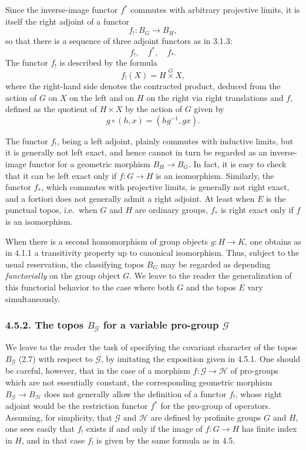\documentclass[11pt]{article}
\newcommand{\G}{\mathcal{G}}
\newcommand{\Hh}{\mathcal{H}}
\newcommand{\ie}{i.e.}
\newcommand{\contracted}{\mathop{\times}\limits^{G}}
\begin{document}
Since the inverse-image functor \(f^\ast\) commutes with arbitrary projective limits, it is itself the right adjoint of a functor
\[
f_!:B_G\longrightarrow B_H,
\]
so that there is a sequence of three adjoint functors as in 3.1.3:
\[
f_!,\quad f^\ast,\quad f_\ast.
\]
The functor \(f_!\) is described by the formula
\[
f_!(X)=H\contracted X,
\]
where the right-hand side denotes the contracted product, deduced from the action of \(G\) on \(X\) on the left and on \(H\) on the right via right translations and \(f\), defined as the quotient of \(H\times X\) by the action of \(G\) given by
\[
g\circ(h,x)=(hg^{-1},gx).
\]

The functor \(f_!\), being a left adjoint, plainly commutes with inductive limits, but it is generally not left exact, and hence cannot in turn be regarded as an inverse-image functor for a geometric morphism \(B_H\to B_G\). In fact, it is easy to check that it can be left exact only if \(f:G\to H\) is an isomorphism. Similarly, the functor \(f_\ast\), which commutes with projective limits, is generally not right exact, and a fortiori does not generally admit a right adjoint. At least when \(E\) is the punctual topos, \ie\ when \(G\) and \(H\) are ordinary groups, \(f_\ast\) is right exact only if \(f\) is an isomorphism.

When there is a second homomorphism of group objects \(g:H\to K\), one obtains as in 4.1.1 a transitivity property up to canonical isomorphism. Thus, subject to the usual reservation, the classifying topos \(B_G\) may be regarded as depending \emph{functorially} on the group object \(G\). We leave to the reader the generalization of this functorial behavior to the case where both \(G\) and the topos \(E\) vary simultaneously.

\subsubsection*{4.5.2. The topos \(B_\G\) for a variable pro-group \(\G\)}
We leave to the reader the task of specifying the covariant character of the topos \(B_\G\) (2.7) with respect to \(\G\), by imitating the exposition given in 4.5.1. One should be careful, however, that in the case of a morphism \(f:\G\to\Hh\) of pro-groups which are not essentially constant, the corresponding geometric morphism \(B_\G\to B_\Hh\) does not generally allow the definition of a functor \(f_!\), whose right adjoint would be the restriction functor \(f^\ast\) for the pro-group of operators. Assuming, for simplicity, that \(\G\) and \(\Hh\) are defined by profinite groups \(G\) and \(H\), one sees easily that \(f_!\) exists if and only if the image of \(f:G\to H\) has finite index in \(H\), and in that case \(f_!\) is given by the same formula as in 4.5.
\end{document}
